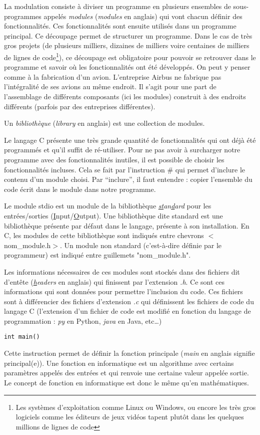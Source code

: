 \documentclass[../../main.tex]{subfiles}
\begin{document}
La modulation consiste à diviser un programme en plusieurs ensembles de sous-programmes appelés \textit{modules} (\textit{modules} en anglais) qui vont chacun définir des fonctionnalités. Ces fonctionnalités sont ensuite utilisés dans un programme principal. Ce découpage permet de structurer un programme. Dans le cas de très gros projets (de plusieurs milliers, dizaines de milliers voire centaines de milliers de lignes de code\footnote{Les systèmes d'exploitation comme Linux ou Windows, ou encore les très gros logiciels comme les éditeurs de jeux vidéos tapent plutôt dans les quelques millions de lignes de code}), ce découpage est obligatoire pour pouvoir se retrouver dans le programme et savoir où les fonctionnalités ont été développés. On peut y penser comme à la fabrication d'un avion. L'entreprise Airbus ne fabrique pas l'intégralité de ses avions au même endroit. Il s'agit pour une part de l'assemblage de différents composants (ici les modules) construit à des endroits différents (parfois par des entreprises différentes).

Un \textit{bibliothèque} (\textit{library} en anglais) est une collection de modules.

Le langage C présente une très grande quantité de fonctionnalités qui ont déjà été programmés et qu'il suffit de ré-utiliser. Pour ne pas avoir à surcharger notre programme avec des fonctionnalités inutiles, il est possible de choisir les fonctionnalités incluses. Cela se fait par l'instruction \textsf{\#} qui permet d'inclure le contenu d'un module choisi. Par ``inclure'', il faut entendre : copier l'ensemble du code écrit dans le module dans notre programme.

Le module \textsf{stdio} est un module de la bibliothèque \textit{\underline{st}an\underline{d}ard} pour les entrées/sorties (\underline{I}nput/\underline{O}utput). Une bibliothèque dite standard est une bibliothèque présente par défaut dans le langage, présente à son installation. En C, les modules de cette bibliothèque sont indiqués entre chevrons \textsf{$<$nom\_module.h$>$}. Un module non standard (c'est-à-dire définie par le programmeur) est indiqué entre guillemets \textsf{"nom\_module.h"}.

Les informations nécessaires de ces modules sont stockés dans des fichiers dit d'entête (\textit{\underline{h}eaders} en anglais) qui finissent par l'extension \textit{.h}. Ce sont ces informations qui sont données pour permettre l'inclusion du code. Ces fichiers sont à différencier des fichiers d'extension \textit{.c} qui définissent les fichiers de code du langage C (l'extension d'un fichier de code est modifié en fonction du langage de programmation : \textit{py} en Python, \textit{java} en Java, etc\dots)
\begin{verbatim}
int main()
\end{verbatim}
Cette instruction permet de définir la fonction principale (\textit{main} en anglais signifie principal(e)). Une fonction en informatique est un algorithme avec certains paramètres appelés des entrées et qui renvoie une certaine valeur appelée sortie. Le concept de fonction en informatique est donc le même qu'en mathématiques.
\end{document}
